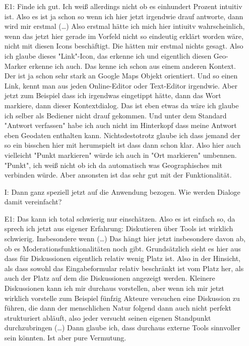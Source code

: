 \begin{itemize}
    \item[E1:] Finde ich gut. Ich wei{\ss} allerdings nicht ob es einhundert Prozent intuitiv ist. Also es ist ja schon so wenn ich hier jetzt irgendwie drauf antworte, dann wird mir erstmal (\dots) Also erstmal h{\"a}tte ich mich hier intiuitv wahrscheinlich, wenn das jetzt hier gerade im Vorfeld nicht so eindeutig erkl{\"a}rt worden w{\"a}re, nicht mit diesen Icons besch{\"a}ftigt. Die h{\"a}tten mir erstmal nichts gesagt. Also ich glaube dieses "Link"-Icon, das erkenne ich und eigentlich diesen Geo-Marker erkenne ich auch. Das kenne ich schon aus einem anderen Kontext. Der ist ja schon sehr stark an Google Maps Objekt orientiert. Und so einen Link, kennt man aus jeden Online-Editor oder Text-Editor irgendwie. Aber jetzt zum Beispiel dass ich irgendwas eingetippt h{\"a}tte, dann das Wort markiere, dann dieser Kontextdialog. Das ist eben etwas da w{\"a}re ich glaube ich selber als Bediener nicht drauf gekommen. Und unter dem Standard "Antwort verfassen" habe ich auch nicht im Hinterkopf dass meine Antwort eben Geodaten enthalten kann. Nichtsdestotrotz glaube ich dass jemand der so ein bisschen hier mit herumspielt ist dass dann schon klar. Also hier auch vielleicht "Punkt markieren" w{\"u}rde ich auch in "Ort markieren" umbennen. "Punkt", ich wei{\ss} nicht ob ich da automatisch was Geographisches mit verbinden w{\"u}rde. Aber ansonsten ist das sehr gut mit der Funktionalit{\"a}t.
    \item[I:] Dann ganz speziell jetzt auf die Anwendung bezogen. Wie werden Dialoge damit vereinfacht?
    \item[E1:] Das kann ich total schwierig nur einsch{\"a}tzen. Also es ist einfach so, da sprech ich jetzt aus eigener Erfahrung: Diskutieren {\"u}ber Tools ist wirklich schwierig. Insbesondere wenn (\dots) Das h{\"a}ngt hier jetzt insbesondere davon ab, ob es Moderationsfunktionalit{\"a}ten noch gibt. Grunds{\"a}tzlich sieht es hier aus dass f{\"u}r Diskussionen eigentlich relativ wenig Platz ist. Also in der Hinsicht, als dass sowohl das Eingabeformular relativ beschr{\"a}nkt ist vom Platz her, als auch der Platz auf dem die Diskussionen angezeigt werden. Kleinere Diskussionen kann ich mir durchaus vorstellen, aber wenn ich mir jetzt wirklich vorstelle zum Beispiel f{\"u}nfzig Akteure versuchen eine Diskussion zu f{\"u}hren, die dann der menschlichen Natur folgend dann auch nicht perfekt strukturiert abl{\"a}uft, also jeder versucht seinen eigenen Standpunkt durchzubringen (\dots) Dann glaube ich, dass durchaus externe Tools sinnvoller sein k{\"o}nnten. Ist aber pure Vermutung.

\end{itemize}
